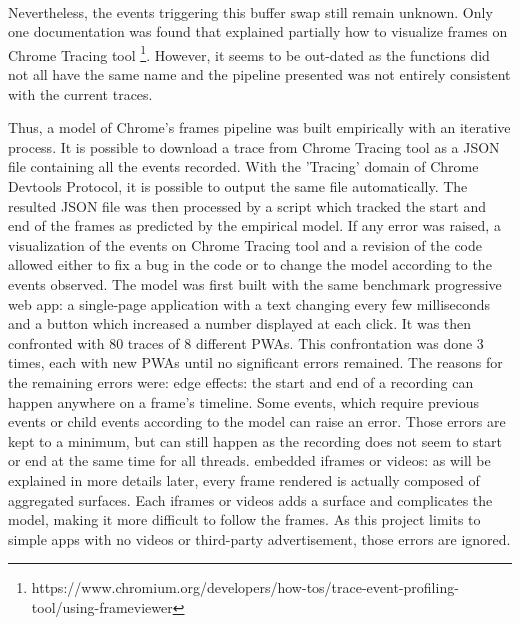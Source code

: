\documentclass{kththesis}
\begin{document}
\paragraph{}
Nevertheless, the events triggering this buffer swap still remain unknown. Only one documentation was found that explained partially how to visualize frames on Chrome Tracing tool \footnote{https://www.chromium.org/developers/how-tos/trace-event-profiling-tool/using-frameviewer}. However, it seems to be out-dated as the functions did not all have the same name and the pipeline presented was not entirely consistent with the current traces. 

Thus, a model of Chrome's frames pipeline was built empirically with an iterative process. It is possible to download a trace from Chrome Tracing tool as a JSON file containing all the events recorded. With the 'Tracing' domain of Chrome Devtools Protocol, it is possible to output the same file automatically. The resulted JSON file was then processed by a script which tracked the start and end of the frames as predicted by the empirical model. If any error was raised, a visualization of the events on Chrome Tracing tool and a revision of the code allowed either to fix a bug in the code or to change the model according to the events observed. \newline
The model was first built with the same benchmark progressive web app: a single-page application with a text changing every few milliseconds and a button which increased a number displayed at each click. It was then confronted with 80 traces of 8 different PWAs. This confrontation was done 3 times, each with new PWAs until no significant errors remained. The reasons for the remaining errors were: \newline
\textendash  edge effects: the start and end of a recording can happen anywhere on a frame's timeline. Some events, which require previous events or child events according to the model can raise an error. Those errors are kept to a minimum, but can still happen as the recording does not seem to start or end at the same time for all threads. \newline
\textendash  embedded iframes or videos: as will be explained in more details later, every frame rendered is actually composed of aggregated surfaces. Each iframes or videos adds a surface and complicates the model, making it more difficult to follow the frames. As this project limits to simple apps with no videos or third-party advertisement, those errors are ignored. 
\end{document}

